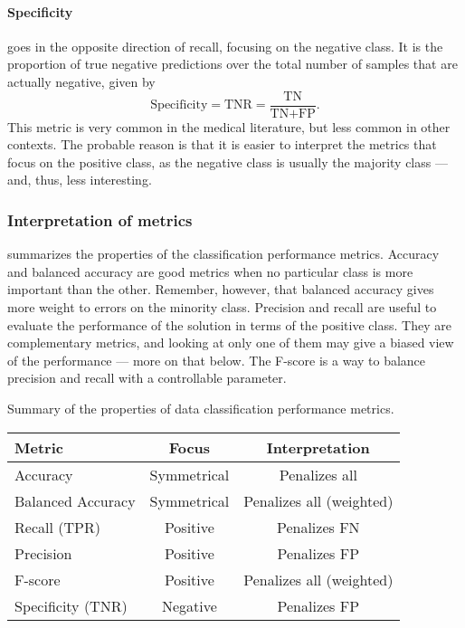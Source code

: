 \paragraph{Specificity} goes in the opposite direction of recall, focusing on the negative
class.  It is the proportion of true negative predictions over the total
number of samples that are actually negative, given by
\begin{equation*}
  \text{Specificity} = \text{TNR} = \frac{\text{TN}}{\text{TN} + \text{FP}}\text{.}
\end{equation*}
This metric is very common in the medical literature, but less common in other contexts.
The probable reason is that it is easier to interpret the metrics that focus on the
positive class, as the negative class is usually the majority class --- and, thus, less
interesting.

\subsubsection{Interpretation of metrics}

 summarizes the properties of the classification
performance metrics.  Accuracy and balanced accuracy are good metrics when no particular
class is more important than the other.  Remember, however, that balanced accuracy gives
more weight to errors on the minority class.  Precision and recall are useful to evaluate
the performance of the solution in terms of the positive class.  They are complementary metrics,
and looking at only one of them may give a biased view of the performance --- more on that
below.  The F-score is a way to balance precision and recall with a controllable parameter.

\begin{tablebox}[label=tab:classification-metrics]{Summary of the properties of
  data classification performance metrics.}
  \centering
  \begin{tabular}{l c c}
    \toprule
    \textbf{Metric} & \textbf{Focus} & \textbf{Interpretation} \\
    \midrule
    Accuracy           & Symmetrical & Penalizes all \\
    Balanced Accuracy  & Symmetrical & Penalizes all (weighted) \\
    Recall (TPR)       & Positive & Penalizes FN \\
    Precision          & Positive & Penalizes FP \\
    F-score            & Positive & Penalizes all (weighted) \\
    Specificity (TNR)  & Negative & Penalizes FP \\
    \bottomrule
  \end{tabular}
\end{tablebox}

